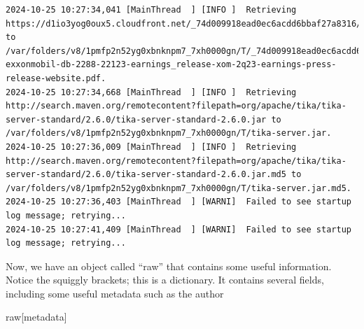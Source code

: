 \documentclass[
  letterpaper,
  DIV=11,
  numbers=noendperiod]{scrreprt}
\newenvironment{Shaded}{\begin{snugshade}}{\end{snugshade}}
\newcommand{\NormalTok}[1]{\textcolor[rgb]{0.00,0.23,0.31}{#1}}
\newcommand{\StringTok}[1]{\textcolor[rgb]{0.13,0.47,0.30}{#1}}
\begin{document}
\begin{verbatim}
2024-10-25 10:27:34,041 [MainThread  ] [INFO ]  Retrieving https://d1io3yog0oux5.cloudfront.net/_74d009918ead0ec6acdd6bbaf27a8316/exxonmobil/db/2288/22123/earnings_release/XOM+2Q23+Earnings+Press+Release+Website.pdf to /var/folders/v8/1pmfp2n52yg0xbnknpm7_7xh0000gn/T/_74d009918ead0ec6acdd6bbaf27a8316-exxonmobil-db-2288-22123-earnings_release-xom-2q23-earnings-press-release-website.pdf.
2024-10-25 10:27:34,668 [MainThread  ] [INFO ]  Retrieving http://search.maven.org/remotecontent?filepath=org/apache/tika/tika-server-standard/2.6.0/tika-server-standard-2.6.0.jar to /var/folders/v8/1pmfp2n52yg0xbnknpm7_7xh0000gn/T/tika-server.jar.
2024-10-25 10:27:36,009 [MainThread  ] [INFO ]  Retrieving http://search.maven.org/remotecontent?filepath=org/apache/tika/tika-server-standard/2.6.0/tika-server-standard-2.6.0.jar.md5 to /var/folders/v8/1pmfp2n52yg0xbnknpm7_7xh0000gn/T/tika-server.jar.md5.
2024-10-25 10:27:36,403 [MainThread  ] [WARNI]  Failed to see startup log message; retrying...
2024-10-25 10:27:41,409 [MainThread  ] [WARNI]  Failed to see startup log message; retrying...
\end{verbatim}

Now, we have an object called ``raw'' that contains some useful
information. Notice the squiggly brackets; this is a dictionary. It
contains several fields, including some useful metadata such as the
author

\begin{Shaded}
\begin{Highlighting}[]
\NormalTok{raw[}\StringTok{\textquotesingle{}metadata\textquotesingle{}}\NormalTok{]}
\end{Highlighting}
\end{Shaded}
\end{document}
